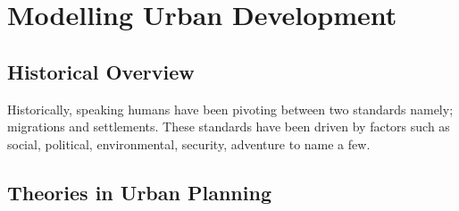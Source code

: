 \section{Modelling Urban Development}
\subsection{Historical Overview}
Historically, speaking humans have been pivoting between two standards namely; migrations and settlements. These standards have been driven by factors such as social, political, environmental, security, adventure to name a few.\cite{mum}

\subsection{Theories in Urban Planning}


